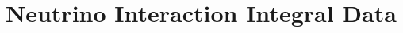 \documentclass[12pt]{uh_thesis}
\begin{document}
\tableofcontents
\listoffigures
\listoftables
\printnomenclature

\mainmatter













\printbibliography[heading=bibintoc]

\appendix

\chapter{Neutrino Interaction Integral Data}~\label{app:integral_data}


\printindex
\end{document}
